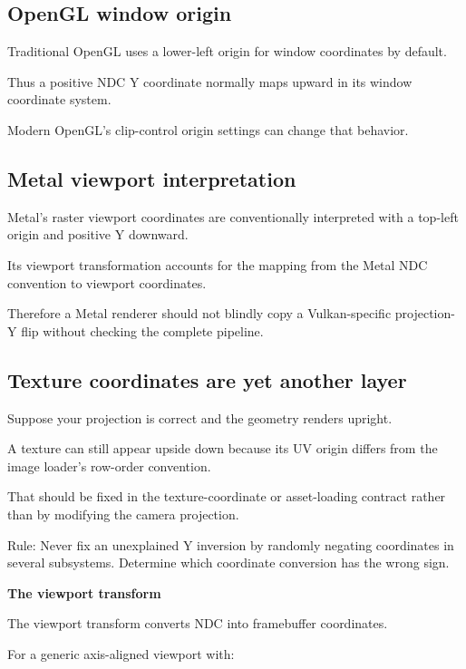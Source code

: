 \subsection{OpenGL window origin}\label{02-foundations-ii-ch033-opengl-window-origin}

Traditional OpenGL uses a lower-left origin for window coordinates by default.

Thus a positive NDC Y coordinate normally maps upward in its window coordinate system.

Modern OpenGL's clip-control origin settings can change that behavior.

\subsection{Metal viewport interpretation}\label{02-foundations-ii-ch033-metal-viewport-interpretation}

Metal's raster viewport coordinates are conventionally interpreted with a top-left origin and positive Y downward.

Its viewport transformation accounts for the mapping from the Metal NDC convention to viewport coordinates.

Therefore a Metal renderer should not blindly copy a Vulkan-specific projection-Y flip without checking the complete pipeline.

\subsection{Texture coordinates are yet another layer}\label{02-foundations-ii-ch033-texture-coordinates-are-yet-another-layer}

Suppose your projection is correct and the geometry renders upright.

A texture can still appear upside down because its UV origin differs from the image loader's row-order convention.

That should be fixed in the texture-coordinate or asset-loading contract rather than by modifying the camera projection.

Rule: Never fix an unexplained Y inversion by randomly negating coordinates in several subsystems. Determine which coordinate conversion has the wrong sign.

\textbf{The viewport transform}

The viewport transform converts NDC into framebuffer coordinates.

For a generic axis-aligned viewport with:

